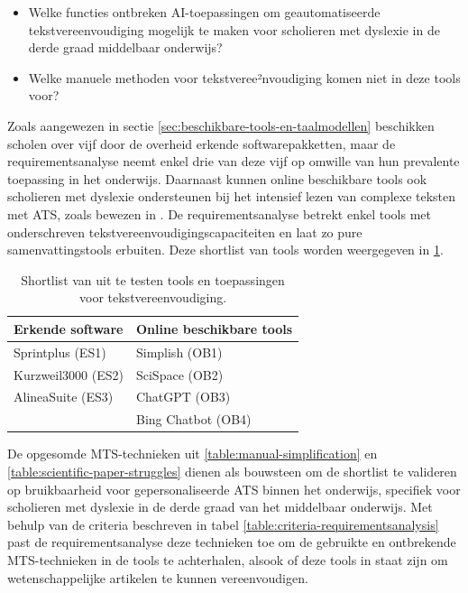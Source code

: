 \begin{itemize}
	\item Welke functies ontbreken AI-toepassingen om geautomatiseerde tekstvereenvoudiging mogelijk te maken voor scholieren met dyslexie in de derde graad middelbaar onderwijs?
	\item Welke manuele methoden voor tekstveree²nvoudiging komen niet in deze tools voor?
\end{itemize}

\medspace

Zoals aangewezen in sectie \ref{sec:beschikbare-tools-en-taalmodellen} beschikken scholen over vijf door de overheid erkende softwarepakketten, maar de requirementsanalyse neemt enkel drie van deze vijf op omwille van hun prevalente toepassing in het onderwijs. Daarnaast kunnen online beschikbare tools ook scholieren met dyslexie ondersteunen bij het intensief lezen van complexe teksten met ATS, zoals bewezen in \textcite{Bingel2018}. De requirementsanalyse betrekt enkel tools met onderschreven tekstvereenvoudigingscapaciteiten en laat zo pure samenvattingstools erbuiten. Deze shortlist van tools worden weergegeven in \ref{table:shortlist-tools}.

\medspace

\begin{center}
	\begin{table}[H]
		\begin{tabular}{ | m{6cm} | m{6cm} | } 
			\hline
			\textbf{Erkende software} & \textbf{Online beschikbare tools} \\
			\hline
			Sprintplus (ES1) & Simplish (OB1) \\
			Kurzweil3000 (ES2) & SciSpace (OB2) \\ 
			AlineaSuite	(ES3) & ChatGPT (OB3) \\
			& Bing Chatbot (OB4)\\
			\hline
		\end{tabular}
	\caption{Shortlist van uit te testen tools en toepassingen voor tekstvereenvoudiging.}
	\label{table:shortlist-tools}	
	\end{table}
\end{center}

De opgesomde MTS-technieken uit \ref{table:manual-simplification} en \ref{table:scientific-paper-struggles} dienen als bouwsteen om de shortlist te valideren op bruikbaarheid voor gepersonaliseerde ATS binnen het onderwijs, specifiek voor scholieren met dyslexie in de derde graad van het middelbaar onderwijs. Met behulp van de criteria beschreven in tabel \ref{table:criteria-requirementsanalysis} past de requirementsanalyse deze technieken toe om de gebruikte en ontbrekende MTS-technieken in de tools te achterhalen,  alsook of deze tools in staat zijn om wetenschappelijke artikelen te kunnen vereenvoudigen. 

